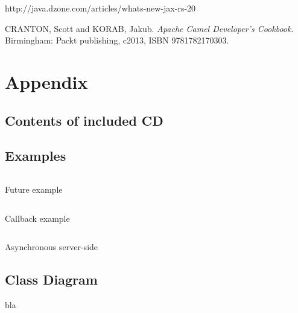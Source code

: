 \documentclass[12pt,final,oneside]{fithesis2}
\begin{document}
\begin{thebibliography}{}
 http://java.dzone.com/articles/whats-new-jax-rs-20 	

%
 CRANTON, Scott and KORAB, Jakub. \textit{Apache Camel Developer's Cookbook}.  Birmingham: Packt publishing, c2013, ISBN 9781782170303.
%
%




\end{thebibliography}

\endgroup
\appendix

\chapter{Appendix}

\section{Contents of included CD}
\newpage
\section{Examples}
\begin{listing}[ht]
	\inputminted[]{java}{sources/future.java}
	\caption{Future example}
	\label{future}
\end{listing}
\begin{listing}[ht]
	\inputminted[]{java}{sources/callbackClient.java}
	\caption{Callback example}
	\label{callbackClient}
\end{listing}

\begin{listing}[ht]
	\inputminted[]{java}{sources/todo.java}
	\caption{Asynchronous server-side}
	\label{async-server}
\end{listing}
\newpage
\section{Class Diagram}
bla
\end{document}

